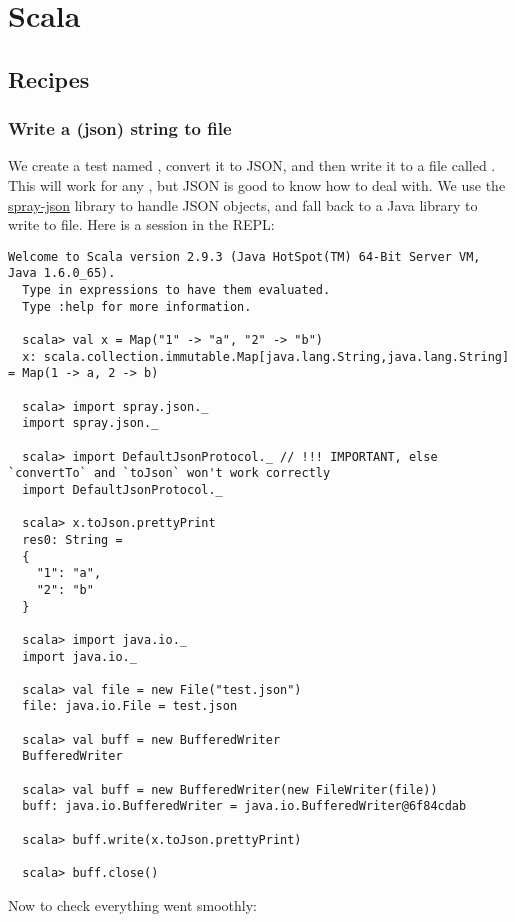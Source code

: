 \chapter{Scala}

\section{Recipes}
\subsection{Write a (json) string to file}

  We create a test  named , convert it to JSON, and then write it to
  a file called .  This will work for any , but JSON is 
  good to know how to deal with.  We use the 
  \href{https://github.com/spray/spray-json}{spray-json} library to handle JSON
  objects, and fall back to a Java library to write to file.  Here is a session
  in the REPL:
  \begin{lstlisting}[style=bash]
  Welcome to Scala version 2.9.3 (Java HotSpot(TM) 64-Bit Server VM, Java 1.6.0_65).
  Type in expressions to have them evaluated.
  Type :help for more information.

  scala> val x = Map("1" -> "a", "2" -> "b")
  x: scala.collection.immutable.Map[java.lang.String,java.lang.String] = Map(1 -> a, 2 -> b)

  scala> import spray.json._
  import spray.json._

  scala> import DefaultJsonProtocol._ // !!! IMPORTANT, else `convertTo` and `toJson` won't work correctly
  import DefaultJsonProtocol._

  scala> x.toJson.prettyPrint
  res0: String = 
  {
    "1": "a",
    "2": "b"
  }

  scala> import java.io._
  import java.io._

  scala> val file = new File("test.json")
  file: java.io.File = test.json

  scala> val buff = new BufferedWriter
  BufferedWriter   

  scala> val buff = new BufferedWriter(new FileWriter(file))
  buff: java.io.BufferedWriter = java.io.BufferedWriter@6f84cdab

  scala> buff.write(x.toJson.prettyPrint)

  scala> buff.close()
  \end{lstlisting}

  Now to check everything went smoothly:

